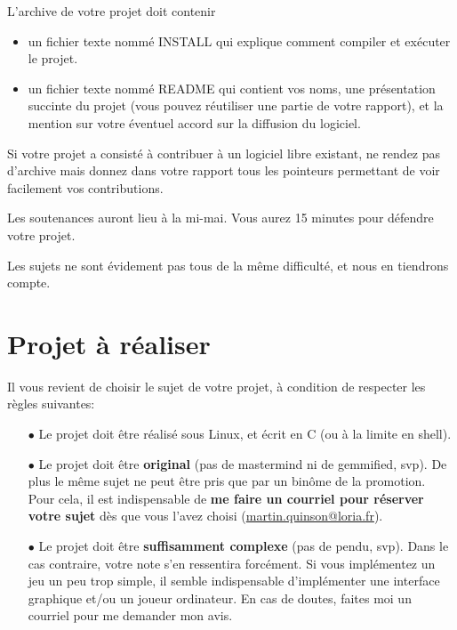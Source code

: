 \documentclass[10pt]{article}
\begin{document}

L'archive de votre projet doit contenir

\begin{itemize}
\item un fichier texte nommé INSTALL qui explique comment compiler et exécuter le projet.
\item un fichier texte nommé README qui contient vos noms, une présentation succinte du projet
      (vous pouvez réutiliser une partie de votre rapport), et la mention sur
      votre éventuel accord sur la diffusion du logiciel.
\end{itemize}

\bigskip

Si votre projet a consisté à contribuer à un logiciel libre existant, ne rendez
pas d'archive mais donnez dans votre rapport tous les pointeurs permettant de voir
facilement vos contributions.

 Les soutenances auront lieu à la mi-mai. Vous aurez 15 minutes
pour défendre votre projet.

 Les sujets ne sont évidement pas tous de la même difficulté,
et nous en tiendrons compte.


\section*{Projet à réaliser}\vspace{-.5\baselineskip}

Il vous revient de choisir le sujet de votre projet, à condition de respecter les règles suivantes:
\begin{itemize}
\item[$\bullet$] Le projet doit être réalisé sous Linux, et écrit en C (ou à la
  limite en shell).
\item[$\bullet$] Le projet doit être \textbf{original} (pas de mastermind ni de
  gemmified, svp). De plus le même sujet ne peut être pris que par un binôme de
  la promotion. Pour cela, il est indispensable de \textbf{me faire un courriel
    pour réserver votre sujet} dès que vous l'avez choisi
  (\url{martin.quinson@loria.fr}).
\item[$\bullet$] Le projet doit être \textbf{suffisamment complexe} (pas de
  pendu, svp). Dans le cas contraire, votre note s'en ressentira forcément. Si
  vous implémentez un jeu un peu trop simple, il semble indispensable
  d'implémenter une interface graphique et/ou un joueur ordinateur. En cas de
  doutes, faites moi un courriel pour me demander mon avis.
\end{itemize}
\end{document}
